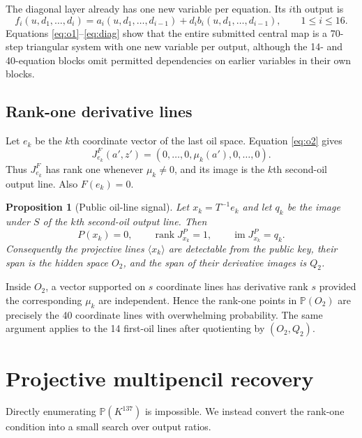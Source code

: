 \documentclass[11pt]{article}
\newtheorem{proposition}[theorem]{Proposition}
\newcommand{\Proj}{\mathbb{P}}
\newcommand{\rank}{\operatorname{rank}}
\newcommand{\im}{\operatorname{im}}
\begin{document}
The diagonal layer already has one new variable per equation.  Its $i$th
output is
\begin{equation}
 f_i(u,d_1,\ldots,d_i)
   =a_i(u,d_1,\ldots,d_{i-1})
    +d_i b_i(u,d_1,\ldots,d_{i-1}),
       \qquad 1\leq i\leq16.                         \label{eq:diag}
\end{equation}
Equations \eqref{eq:o1}--\eqref{eq:diag} show that the entire submitted
central map is a 70-step triangular system with one new variable per output,
although the 14- and 40-equation blocks omit permitted dependencies on earlier
variables in their own blocks.

\subsection{Rank-one derivative lines}

Let $e_k$ be the $k$th coordinate vector of the last oil space.  Equation
\eqref{eq:o2} gives
\[
  J^F_{e_k}(a',z')=(0,\ldots,0,\mu_k(a'),0,\ldots,0).
\]
Thus $J^F_{e_k}$ has rank one whenever $\mu_k\neq0$, and its image is the
$k$th second-oil output line.  Also $F(e_k)=0$.

\begin{proposition}[Public oil-line signal]
Let $x_k=T^{-1}e_k$ and let $q_k$ be the image under $S$ of the $k$th
second-oil output line.  Then
\[
       P(x_k)=0,\qquad \rank J^P_{x_k}=1,
       \qquad \im J^P_{x_k}=q_k.
\]
Consequently the projective lines $\langle x_k\rangle$ are detectable from
the public key, their span is the hidden space $O_2$, and the span of their
derivative images is $Q_2$.
\end{proposition}

Inside $O_2$, a vector supported on $s$ coordinate lines has derivative rank
$s$ provided the corresponding $\mu_k$ are independent.  Hence the rank-one
points in $\Proj(O_2)$ are precisely the 40 coordinate lines with overwhelming
probability.  The same argument applies to the 14 first-oil lines after
quotienting by $(O_2,Q_2)$.

\section{Projective multipencil recovery}

Directly enumerating $\Proj(K^{137})$ is impossible.  We instead convert the
rank-one condition into a small search over output ratios.
\end{document}
